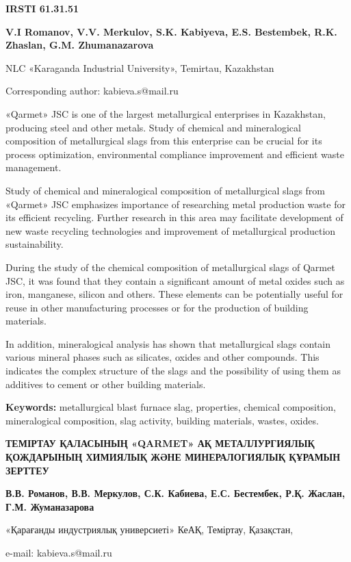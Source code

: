 \newpage
{\bfseries IRSTI 61.31.51}


\begin{center}
{\bfseries V.I Romanov, V.V. Merkulov, S.K. Kabiyeva, E.S. Bestembek, R.K. Zhaslan, G.M. Zhumanazarova}

NLC «Karaganda Industrial University», Temirtau, Kazakhstan

Corresponding author: kabieva.s@mail.ru
\end{center}

«Qarmet» JSC is one of the largest metallurgical enterprises in
Kazakhstan, producing steel and other metals. Study of chemical and
mineralogical composition of metallurgical slags from this enterprise
can be crucial for its process optimization, environmental compliance
improvement and efficient waste management.

Study of chemical and mineralogical composition of metallurgical slags
from «Qarmet» JSC emphasizes importance of researching metal production
waste for its efficient recycling. Further research in this area may
facilitate development of new waste recycling technologies and
improvement of metallurgical production sustainability.

During the study of the chemical composition of metallurgical slags of
Qarmet JSC, it was found that they contain a significant amount of metal
oxides such as iron, manganese, silicon and others. These elements can
be potentially useful for reuse in other manufacturing processes or for
the production of building materials.

In addition, mineralogical analysis has shown that metallurgical slags
contain various mineral phases such as silicates, oxides and other
compounds. This indicates the complex structure of the slags and the
possibility of using them as additives to cement or other building
materials.

{\bfseries Keywords:} metallurgical blast furnace slag, properties,
chemical composition, mineralogical composition, slag activity, building
materials, wastes, oxides.

\begin{center}
{\large\bfseries ТЕМІРТАУ ҚАЛАСЫНЫҢ «QARMET» АҚ МЕТАЛЛУРГИЯЛЫҚ ҚОЖДАРЫНЫҢ
ХИМИЯЛЫҚ ЖӘНЕ МИНЕРАЛОГИЯЛЫҚ ҚҰРАМЫН ЗЕРТТЕУ}

{\bfseries В.В. Романов, В.В. Меркулов, С.К. Кабиева, Е.С. Бестембек, Р.Қ. Жаслан, Г.М. Жуманазарова}

«Қарағанды индустриялық универсиеті» КеАҚ, Теміртау, Қазақстан,

e-mail: kabieva.s@mail.ru
\end{center}

